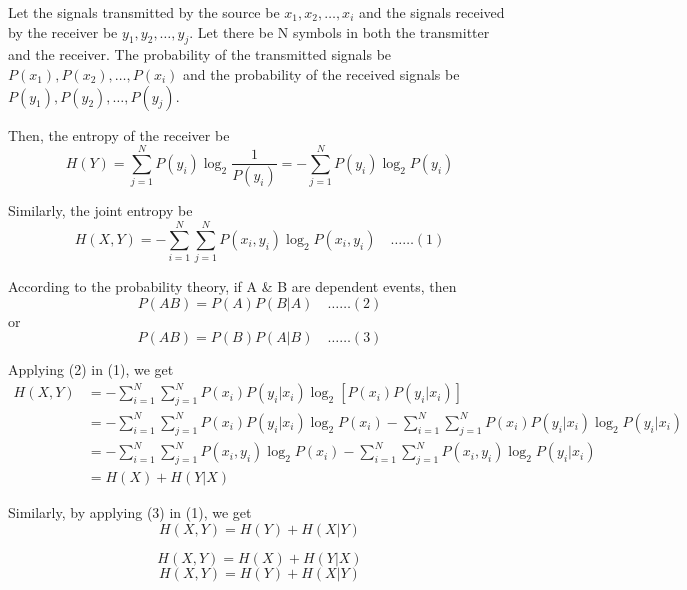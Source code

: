 \documentclass[12pt]{article}
\begin{document}
Let the signals transmitted by the source be $x_1, x_2, \ldots, x_i$ and the signals received by the receiver be $y_1, y_2, \ldots, y_j$.
Let there be N symbols in both the transmitter and the receiver.
The probability of the transmitted signals be $P(x_1), P(x_2), \ldots, P(x_i)$ and the probability of the received signals be $P(y_1), P(y_2), \ldots, P(y_j)$.

Then, the entropy of the receiver be
$$H(Y) = \sum_{j=1}^{N} P(y_i) \log_2 \frac{1}{P(y_i)} = - \sum_{j=1}^{N} P(y_i) \log_2 P(y_i)$$

Similarly, the joint entropy be
$$H(X,Y) = - \sum_{i=1}^{N} \sum_{j=1}^{N} P(x_i, y_i) \log_2 P(x_i, y_i) \quad \ldots\ldots(1)$$

According to the probability theory, if A \& B are dependent events, then
$$P(AB) = P(A)P(B|A) \quad \ldots\ldots(2)$$
or
$$P(AB) = P(B)P(A|B) \quad \ldots\ldots(3)$$

Applying (2) in (1), we get
\begin{align*}
	H(X,Y) & = - \sum_{i=1}^{N} \sum_{j=1}^{N} P(x_i) P(y_i|x_i) \log_2 [P(x_i) P(y_i|x_i)]                                                        \\
	       & = - \sum_{i=1}^{N} \sum_{j=1}^{N} P(x_i) P(y_i|x_i) \log_2 P(x_i) - \sum_{i=1}^{N} \sum_{j=1}^{N} P(x_i) P(y_i|x_i) \log_2 P(y_i|x_i) \\
	       & = - \sum_{i=1}^{N} \sum_{j=1}^{N} P(x_i, y_i) \log_2 P(x_i) - \sum_{i=1}^{N} \sum_{j=1}^{N} P(x_i, y_i) \log_2 P(y_i|x_i)             \\
	       & = H(X) + H(Y|X)
\end{align*}

Similarly, by applying (3) in (1), we get
$$H(X,Y) = H(Y) + H(X|Y)$$

$$H(X,Y) = H(X) + H(Y|X)$$
$$H(X,Y) = H(Y) + H(X|Y)$$
\end{document}
